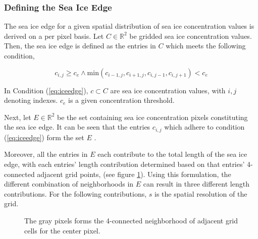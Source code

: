 \documentclass[../main/thesis.tex]{subfiles}
\begin{document}


\subsubsection{Defining the Sea Ice Edge}
\label{sec:iceedgelength}
The sea ice edge for a given spatial distribution of sea ice concentration values is derived on a per pixel basis. Let $C \in{\mathbb{R}^2}$ be gridded sea ice concentration values. Then, the sea ice edge is defined as the entries in $C$ which meets the following condition,

\begin{equation}
    \label{eq:iceedge}
    c_{i,j} \geq c_e \wedge \text{min}{(c_{i-1,j},c_{i+1,j},c_{i,j-1},c_{i,j+1})} < c_e
\end{equation}

In Condition (\ref{eq:iceedge}), $c \subset C$ are sea ice concentration values, with $i,j$ denoting indexes. $c_e$ is a given concentration threshold.

Next, let $E \in{\mathbb{R}^2}$ be the set containing sea ice concentration pixels constituting the sea ice edge. It can be seen that the entries $c_{i,j}$ which adhere to condition (\ref{eq:iceedge}) form the set $E$ \citep{Melsom2019}.

Moreover, all the entries in $E$ each contribute to the total length of the sea ice edge, with each entries' length contribution determined based on that entries' 4-connected adjacent grid points, (see figure \ref{fig:4-connection}). Using this formulation, the different combination of neighborhoods in $E$ can result in three different length contributions. For the following contributions, $s$ is the spatial resolution of the grid.

\begin{figure}
    \centering
    
    \caption{\label{fig:4-connection}The gray pixels forms the 4-connected neighborhood of adjacent grid cells for the center pixel.}
\end{figure}
\end{document}
